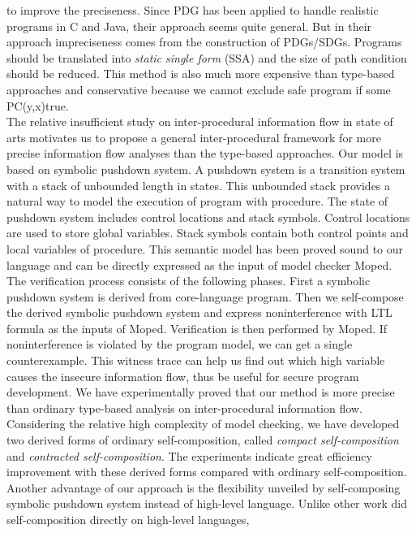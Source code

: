 \documentclass{llncs}
\begin{document}
to improve the preciseness. Since PDG has been applied to handle
realistic programs in C and Java, their approach seems quite
general. But in their approach impreciseness comes from the
construction of PDGs/SDGs. Programs should be translated into
\emph{static single form} (SSA) and the size of path condition
should be reduced. This method is also much more expensive than
type-based approaches and conservative because we cannot exclude
safe program if some PC(y,x)true.\\
\indent The relative insufficient study on inter-procedural
information flow in state of arts motivates us to propose a general
inter-procedural framework for more precise information flow
analyses than the type-based approaches. Our model is based on
symbolic pushdown system\cite{mcps:schwoon}. A pushdown system is a
transition system with a stack of unbounded length in states. This
unbounded stack provides a natural way to model the execution of
program with procedure. The state of pushdown system includes
control locations and stack symbols. Control locations are used to
store global variables. Stack symbols contain both control points
and local variables of procedure. This semantic model has been
proved sound to our language and can be directly expressed as the
input of model checker Moped\cite{mcps:moped}.\\
\indent The verification process consists of the following phases.
First a symbolic pushdown system is derived from core-language
program. Then we self-compose the derived symbolic pushdown system
and express noninterference with LTL formula as the inputs of Moped.
Verification is then performed by Moped. If noninterference is
violated by the program model, we can get a single counterexample.
This witness trace can help us find out which \textsf{high} variable
causes the insecure information flow, thus be useful for secure
program development. We have experimentally proved that our method
is more precise than ordinary type-based analysis on
inter-procedural information flow. Considering the relative high
complexity of model checking, we have developed two derived forms of
ordinary self-composition, called \emph{compact self-composition}
and \emph{contracted self-composition}. The experiments indicate
great efficiency improvement with these derived forms compared with
ordinary self-composition. Another advantage of our approach is the
flexibility unveiled by self-composing symbolic pushdown system
instead of high-level language. Unlike other work did
self-composition directly on high-level
languages\cite{DBLP:conf/pldi/UnnoKY06}\cite{DBLP:conf/sas/TerauchiA05},
\end{document}
